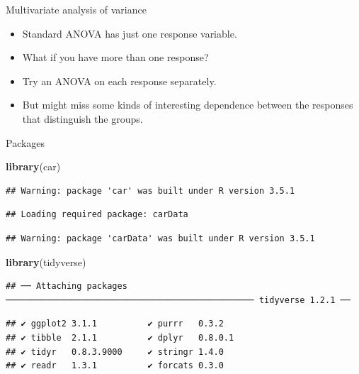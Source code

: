 \documentclass[ignorenonframetext,]{beamer}
\newenvironment{Shaded}{\begin{snugshade}}{\end{snugshade}}
\newcommand{\KeywordTok}[1]{\textcolor[rgb]{0.13,0.29,0.53}{\textbf{#1}}}
\newcommand{\NormalTok}[1]{#1}
\begin{document}
\begin{frame}{Multivariate analysis of variance}
\protect\hypertarget{multivariate-analysis-of-variance}{}

\begin{itemize}
\item
  Standard ANOVA has just one response variable.
\item
  What if you have more than one response?
\item
  Try an ANOVA on each response separately.
\item
  But might miss some kinds of interesting dependence between the
  responses that distinguish the groups.
\end{itemize}

\end{frame}

\begin{frame}[fragile]{Packages}
\protect\hypertarget{packages-4}{}

\begin{Shaded}
\begin{Highlighting}[]
\KeywordTok{library}\NormalTok{(car)}
\end{Highlighting}
\end{Shaded}

\begin{verbatim}
## Warning: package 'car' was built under R version 3.5.1
\end{verbatim}

\begin{verbatim}
## Loading required package: carData
\end{verbatim}

\begin{verbatim}
## Warning: package 'carData' was built under R version 3.5.1
\end{verbatim}

\begin{Shaded}
\begin{Highlighting}[]
\KeywordTok{library}\NormalTok{(tidyverse)}
\end{Highlighting}
\end{Shaded}

\begin{verbatim}
## ── Attaching packages ───────────────────────────────────────────────── tidyverse 1.2.1 ──
\end{verbatim}

\begin{verbatim}
## ✔ ggplot2 3.1.1          ✔ purrr   0.3.2     
## ✔ tibble  2.1.1          ✔ dplyr   0.8.0.1   
## ✔ tidyr   0.8.3.9000     ✔ stringr 1.4.0     
## ✔ readr   1.3.1          ✔ forcats 0.3.0
\end{verbatim}


\end{frame}
\end{document}
